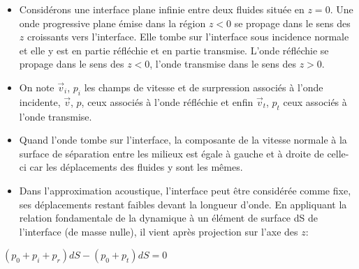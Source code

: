 \documentclass[a4paper, 12pt]{article}
\begin{document}
\begin{itemize}
\item Considérons une interface plane infinie entre deux fluides située en $z=0$. Une onde progressive plane émise dans la région $z < 0$ se propage dans le sens des $z$ croissants vers l'interface. Elle tombe sur l'interface sous incidence normale et elle y est en partie réfléchie et en partie transmise. L'onde réfléchie se propage dans le sens des $z < 0$, l'onde transmise dans le sens des $z > 0$.

\item On note $\overrightarrow{v}_{i}$, $p_{i}$ les champs de vitesse et de surpression associés à l'onde incidente, $\overrightarrow{v}$, $p$, ceux associés à l'onde réfléchie et enfin $\overrightarrow{v}_{t}$, $p_{t}$ ceux associés à l'onde transmise. 



\item Quand l'onde tombe sur l'interface, la composante de la vitesse normale à la surface de séparation entre les milieux est égale à gauche et à droite de celle-ci car les déplacements des fluides y sont les mêmes.

\end{itemize}

\noindent{}

\begin{itemize}
\item Dans l'approximation acoustique, l'interface peut être considérée comme fixe, ses déplacements restant faibles devant la longueur d'onde. En appliquant la relation fondamentale de la dynamique à un élément de surface dS de l'interface (de masse nulle), il vient après projection sur l'axe des $z$:
\end{itemize}

\begin{center}
$(p_{0} + p_{i} + p_{r})dS - (p_{0} + p_{t})dS = 0$
\end{center}
\end{document}
